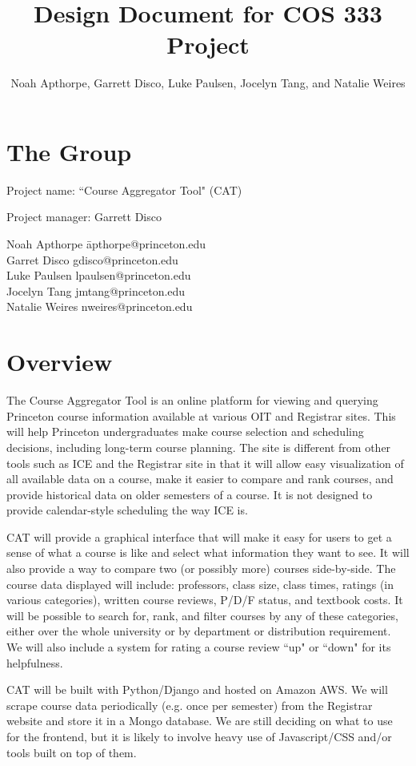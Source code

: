 \documentclass[11pt]{article}
\title{ Design Document for COS 333 Project }
\author{Noah Apthorpe, Garrett Disco, Luke Paulsen, Jocelyn Tang, and Natalie Weires}
\begin{document}
\maketitle

\section{The Group}
\par Project name: ``Course Aggregator Tool" (CAT)
\par Project manager: Garrett Disco
\begin{tabbing}
Noah Apthorpe\; \= apthorpe@princeton.edu \\
Garret Disco \> gdisco@princeton.edu \\
Luke Paulsen \> lpaulsen@princeton.edu \\
Jocelyn Tang \> jmtang@princeton.edu \\
Natalie Weires \> nweires@princeton.edu
\end{tabbing}

\section{Overview}
\par The Course Aggregator Tool is an online platform for viewing and querying Princeton course information available at various OIT and Registrar sites. This will help Princeton undergraduates make course selection and scheduling decisions, including long-term course planning. The site is different from other tools such as ICE and the Registrar site in that it will allow easy visualization of all available data on a course, make it easier to compare and rank courses, and provide historical data on older semesters of a course. It is not designed to provide calendar-style scheduling the way ICE is.
\par CAT will provide a graphical interface that will make it easy for users to get a sense of what a course is like and select what information they want to see. It will also provide a way to compare two (or possibly more) courses side-by-side. The course data displayed will include: professors, class size, class times, ratings (in various categories), written course reviews, P/D/F status, and textbook costs. It will be possible to search for, rank, and filter courses by any of these categories, either over the whole university or by department or distribution requirement. We will also include a system for rating a course review ``up" or ``down" for its helpfulness.
\par CAT will be built with Python/Django and hosted on Amazon AWS. We will scrape course data periodically (e.g. once per semester) from the Registrar website and store it in a Mongo database. We are still deciding on what to use for the frontend, but it is likely to involve heavy use of Javascript/CSS and/or tools built on top of them.
\end{document}
